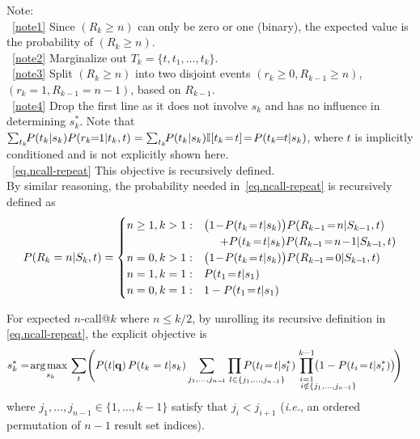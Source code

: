 \noindent
Note: \\
~\eqref{note1} Since $( R_k \geq n )$ can only be zero or one (binary), the expected value is the probability of $( R_k \geq n )$. \\
~\eqref{note2} Marginalize out $T_k\!=\!\{t,t_1,\dots,t_k\}$. \\
~\eqref{note3} Split $( R_k \geq n )$ into two disjoint events $(r_k \! \geq \! 0, R_{k\!-\!1}\!\geq \!n)$, $(r_k\!=\!1, R_{k\!-\!1}\!=\!n\!-\!1)$, based on $R_{k-1}$. \\
~\eqref{note4} Drop the first line as it does not involve $s_k$ and has no influence in determining $s_k^*$. Note that $\sum_{t_k} \!\! P(t_k|s_k) P(r_k\!\!=\!\!1|t_k,t) = \sum_{t_k} \!\! P(t_k|s_k) \I[t_k\!=\!t] \! = \! P(t_k\!\!=\!\!t|s_k)$, where $t$ is implicitly conditioned and is not explicitly shown here. \\
~\eqref{eq.ncall-repeat} This objective is recursively defined. \\

By similar reasoning, the probability needed in~\eqref{eq.ncall-repeat} is recursively defined as
\begin{align*}
P(R_k=n|S_k,t)=
\begin{cases}
n \geq 1, k > 1:  &  \bigl( 1\!-\!P(t_k\!=\!t|s_k) \bigr) P(R_{k-1}\!=\!n|S_{k-1},t) \nonumber \\
  & \hspace{5mm} + P(t_k\!=\!t|s_k) P(R_{k-\!1}\!=\!n\!-\!1|S_{k-\!1},t) \\
n = 0, k > 1:   & \bigl( 1\!-\!P(t_k\!=\!t|s_k) \bigr) P(R_{k-\!1}\!=\!0|S_{k-\!1},t) \\
n = 1, k = 1:   & P(t_1\!=\!t|s_1) \\
n = 0, k = 1:   & 1 - P(t_1\!=\!t|s_1)
\end{cases}
\end{align*}

For expected $n$-call@$k$ where $n \! \leq \! k/2$, by unrolling its recursive definition in \eqref{eq.ncall-repeat}, the explicit objective is
\begin{align}
  & s_k^* = \argmax_{s_k} \sum_t \Biggl( P(t|\vec{q}) \, P(t_k=t|s_k) \sum_{j_1, \dots, j_{n-\!1}} \hspace{-14mm} \prod_{\hspace{14.5mm} l \in \{j_1, \dots, j_{n-\!1}\}} \hspace{-14mm} P(t_l\!=\!t|s_l^*) \hspace{-13mm} \prod_{\substack{i=1 \\ \hspace{14mm} i \notin \{j_1, \dots, j_{n-\!1}\}}}^{k-1} \hspace{-13mm} \!\bigl( 1 - P(t_i\!=\!t|s_i^*) \bigr) \!\Biggr) \label{eq.ncall.alt-repeat}
\end{align}
where $j_1, \dots, j_{n-1} \in \{1,\ldots,k-1\}$ satisfy 
that $j_i < j_{i+1}$ (\emph{i.e.},
an ordered permutation of $n-1$ result set indices). \\

